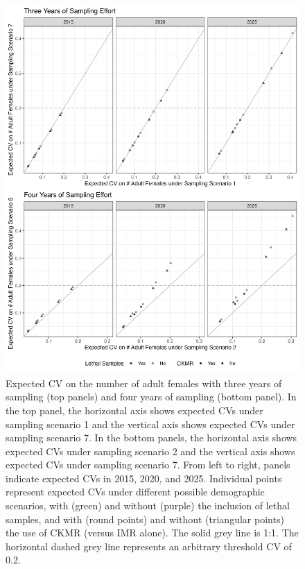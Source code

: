 \begin{figure}
\includegraphics[scale=0.7]{../figures/CVsSameEffort}

\caption{Expected CV on the number of adult females with three years of sampling
(top panels) and four years of sampling (bottom panel). In the top
panel, the horizontal axis shows expected CVs under sampling scenario
1 and the vertical axis shows expected CVs under sampling scenario
7. In the bottom panels, the horizontal axis shows expected CVs under
sampling scenario 2 and the vertical axis shows expected CVs under
sampling scenario 7. From left to right, panels indicate expected
CVs in 2015, 2020, and 2025. Individual points represent expected
CVs under different possible demographic scenarios, with (green) and
without (purple) the inclusion of lethal samples, and with (round
points) and without (triangular points) the use of CKMR (versus IMR
alone). The solid grey line is 1:1. The horizontal dashed grey line
represents an arbitrary threshold CV of 0.2.\label{fig:cvWsameeff}}
\end{figure}

